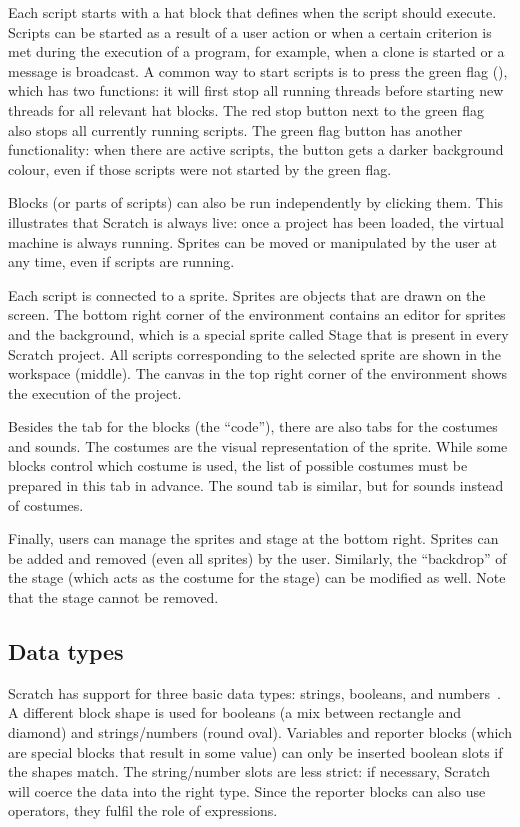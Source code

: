 \documentclass[../main]{subfiles}
\begin{document}
Each script starts with a hat block that defines when the script should execute.
Scripts can be started as a result of a user action or when a certain criterion is met during the execution of a program, for example, when a clone is started or a message is broadcast.
A common way to start scripts is to press the green flag (), which has two functions: it will first stop all running threads before starting new threads for all relevant hat blocks.
The red stop button next to the green flag also stops all currently running scripts.
The green flag button has another functionality: when there are active scripts, the button gets a darker background colour, even if those scripts were not started by the green flag.

Blocks (or parts of scripts) can also be run independently by clicking them.
This illustrates that Scratch is always live: once a project has been loaded, the virtual machine is always running.
Sprites can be moved or manipulated by the user at any time, even if scripts are running.

Each script is connected to a sprite.
Sprites are objects that are drawn on the screen.
The bottom right corner of the environment contains an editor for sprites and the background, which is a special sprite called Stage that is present in every Scratch project.
All scripts corresponding to the selected sprite are shown in the workspace (middle).
The canvas in the top right corner of the environment shows the execution of the project.

Besides the tab for the blocks (the ``code''), there are also tabs for the costumes and sounds.
The costumes are the visual representation of the sprite.
While some blocks control which costume is used, the list of possible costumes must be prepared in this tab in advance.
The sound tab is similar, but for sounds instead of costumes.

Finally, users can manage the sprites and stage at the bottom right.
Sprites can be added and removed (even all sprites) by the user.
Similarly, the ``backdrop'' of the stage (which acts as the costume for the stage) can be modified as well.
Note that the stage cannot be removed.

\subsection{Data types}\label{subsec:scratch-data-types}

Scratch has support for three basic data types: strings, booleans, and numbers~\autocite{maloneyScratchProgrammingLanguage2010}.
A different block shape is used for booleans (a mix between rectangle and diamond) and strings/numbers (round oval).
Variables and reporter blocks (which are special blocks that result in some value) can only be inserted boolean slots if the shapes match.
The string/number slots are less strict: if necessary, Scratch will coerce the data into the right type.
Since the reporter blocks can also use operators, they fulfil the role of expressions.
\end{document}
